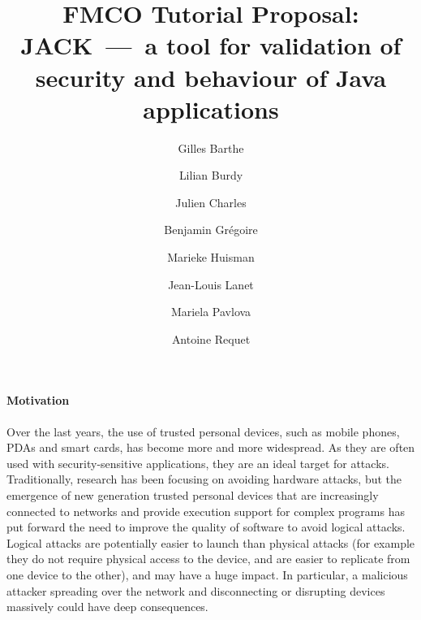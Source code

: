 \documentclass[]{llncs}
\title{FMCO Tutorial Proposal:\\
JACK~---~a tool for validation of security and behaviour of Java applications}
\author{Gilles Barthe\inst{1} \and
        Lilian Burdy\inst{2} \and
        Julien Charles\inst{1} \and
        Benjamin Gr\'egoire\inst{1} \and
        Marieke Huisman\inst{1} \and
        Jean-Louis Lanet\inst{3} \and
        Mariela Pavlova\inst{1} \and
        Antoine Requet\inst{3}}
\institute{INRIA Sophia Antipolis, France \and Clearsy, France \and
Gemplus, France}
\begin{document}
\maketitle




\paragraph{Motivation}
Over the last years, the use of trusted personal devices, such as
mobile phones, PDAs and smart cards, has become more and more
widespread. As they are often used with security-sensitive
applications, they are an ideal target for attacks. Traditionally,
research has been focusing on avoiding hardware attacks, but the
emergence of new generation trusted personal devices that are
increasingly connected to networks and provide execution support for
complex programs has put forward the need to improve the quality of
software to avoid logical attacks.  Logical attacks are potentially
easier to launch than physical attacks (for example they do not
require physical access to the device, and are easier to replicate
from one device to the other), and may have a huge impact.  In
particular, a malicious attacker spreading over the network and
disconnecting or disrupting devices massively could have deep
consequences.
\end{document}
